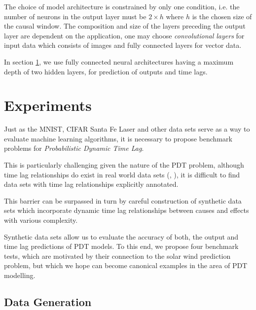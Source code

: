 \documentclass[envcountsect,runningheads]{llncs}
\theoremstyle{etoile}
\begin{document}
The choice of model architecture is constrained by only one condition, i.e. the number of neurons 
in the output layer must be $2 \times h$ where $h$ is the chosen size of the causal window. 
The composition and size of the layers preceding the output layer are dependent on the application, 
one may choose \emph{convolutional layers} for input data which consists of images and fully connected 
layers for vector data.



In section \ref{sec:exp}, we use fully connected neural architectures having a maximum depth of 
two hidden layers, for prediction of outputs and time lags.

\section{Experiments}\label{sec:exp}


Just as the MNIST, CIFAR Santa Fe Laser and other data sets serve as a way to evaluate machine learning 
algorithms, it is necessary to propose benchmark problems for \emph{Probabilistic Dynamic Time Lag}.

This is particularly challenging given the nature of the PDT problem, although time lag 
relationships do exist in real world data sets (\cite{doi:10.1002/jgra.50429}, \cite{ZHOU2006195}), 
it is difficult to find data sets with time lag relationships explicitly annotated.

This barrier can be surpassed in turn by careful construction of synthetic data sets which incorporate 
dynamic time lag relationships between causes and effects with various complexity.

Synthetic data sets allow us to evaluate the accuracy of both, the output and time lag predictions of 
PDT models. To this end, we propose four benchmark tests, which are motivated by their connection 
to the solar wind prediction problem, but which we hope can become canonical examples in the area 
of PDT modelling.

\subsection{Data Generation}
\end{document}
